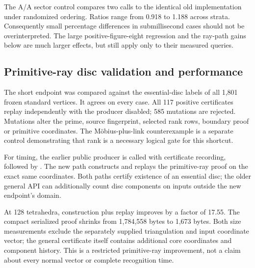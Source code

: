 The A/A sector control compares two calls to the identical old implementation under randomized ordering. Ratios range from 0.918 to 1.188 across strata. Consequently small percentage differences in submillisecond cases should not be overinterpreted. The large positive-figure-eight regression and the ray-path gains below are much larger effects, but still apply only to their measured queries.

\subsection{Primitive-ray disc validation and performance}

The short endpoint was compared against the essential-disc labels of all 1,801 frozen standard vertices. It agrees on every case. All 117 positive certificates replay independently with the producer disabled; 585 mutations are rejected. Mutations alter the prime, source fingerprint, selected rank rows, boundary proof or primitive coordinates. The M\"obius-plus-link counterexample is a separate control demonstrating that rank is a necessary logical gate for this shortcut.

For timing, the earlier public  producer is called with certificate recording, followed by . The new path constructs and replays the primitive-ray proof on the exact same coordinates. Both paths certify existence of an essential disc; the older general API can additionally count disc components on inputs outside the new endpoint's domain.

\begin{table}[H]
\centering\small

\caption{Primitive Fibonacci meridians: times in milliseconds. ``Bits'' is maximum coordinate bit length. Ratio is old/new median construction-plus-replay time, computed from paired sums rather than from the separately displayed medians.}\label{tab:rays}
\end{table}

At 128 tetrahedra, construction plus replay improves by a factor of 17.55. The compact serialized proof shrinks from 1,784,558 bytes to 1,673 bytes. Both size measurements exclude the separately supplied triangulation and input coordinate vector; the general certificate itself contains additional core coordinates and component history. This is a restricted primitive-ray improvement, not a claim about every normal vector or complete recognition time.

